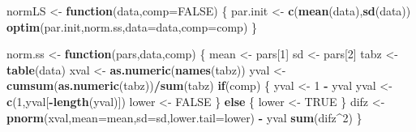 \documentclass[]{article}
\newenvironment{Shaded}{\begin{snugshade}}{\end{snugshade}}
\newcommand{\KeywordTok}[1]{\textcolor[rgb]{0.13,0.29,0.53}{\textbf{#1}}}
\newcommand{\DataTypeTok}[1]{\textcolor[rgb]{0.13,0.29,0.53}{#1}}
\newcommand{\DecValTok}[1]{\textcolor[rgb]{0.00,0.00,0.81}{#1}}
\newcommand{\StringTok}[1]{\textcolor[rgb]{0.31,0.60,0.02}{#1}}
\newcommand{\OtherTok}[1]{\textcolor[rgb]{0.56,0.35,0.01}{#1}}
\newcommand{\ControlFlowTok}[1]{\textcolor[rgb]{0.13,0.29,0.53}{\textbf{#1}}}
\newcommand{\OperatorTok}[1]{\textcolor[rgb]{0.81,0.36,0.00}{\textbf{#1}}}
\newcommand{\NormalTok}[1]{#1}
\begin{document}
\begin{Shaded}
\begin{Highlighting}[]
\NormalTok{normLS <-}\StringTok{ }\ControlFlowTok{function}\NormalTok{(data,}\DataTypeTok{comp=}\OtherTok{FALSE}\NormalTok{) \{}
\NormalTok{    par.init <-}\StringTok{ }\KeywordTok{c}\NormalTok{(}\KeywordTok{mean}\NormalTok{(data),}\KeywordTok{sd}\NormalTok{(data))}
    \KeywordTok{optim}\NormalTok{(par.init,norm.ss,}\DataTypeTok{data=}\NormalTok{data,}\DataTypeTok{comp=}\NormalTok{comp)}
\NormalTok{\}}

\NormalTok{norm.ss <-}\StringTok{ }\ControlFlowTok{function}\NormalTok{(pars,data,comp) \{}
\NormalTok{    mean <-}\StringTok{ }\NormalTok{pars[}\DecValTok{1}\NormalTok{]}
\NormalTok{    sd <-}\StringTok{ }\NormalTok{pars[}\DecValTok{2}\NormalTok{]}
\NormalTok{    tabz <-}\StringTok{ }\KeywordTok{table}\NormalTok{(data)}
\NormalTok{    xval <-}\StringTok{ }\KeywordTok{as.numeric}\NormalTok{(}\KeywordTok{names}\NormalTok{(tabz))}
\NormalTok{    yval <-}\StringTok{ }\KeywordTok{cumsum}\NormalTok{(}\KeywordTok{as.numeric}\NormalTok{(tabz))}\OperatorTok{/}\KeywordTok{sum}\NormalTok{(tabz)}
    \ControlFlowTok{if}\NormalTok{(comp) \{}
\NormalTok{        yval <-}\StringTok{ }\DecValTok{1} \OperatorTok{-}\StringTok{ }\NormalTok{yval}
\NormalTok{        yval <-}\StringTok{ }\KeywordTok{c}\NormalTok{(}\DecValTok{1}\NormalTok{,yval[}\OperatorTok{-}\KeywordTok{length}\NormalTok{(yval)])}
\NormalTok{        lower <-}\StringTok{ }\OtherTok{FALSE}
\NormalTok{    \} }\ControlFlowTok{else}\NormalTok{ \{}
\NormalTok{        lower <-}\StringTok{ }\OtherTok{TRUE}
\NormalTok{    \}}
\NormalTok{    difz <-}\StringTok{ }\KeywordTok{pnorm}\NormalTok{(xval,}\DataTypeTok{mean=}\NormalTok{mean,}\DataTypeTok{sd=}\NormalTok{sd,}\DataTypeTok{lower.tail=}\NormalTok{lower) }\OperatorTok{-}\StringTok{ }\NormalTok{yval}
    \KeywordTok{sum}\NormalTok{(difz}\OperatorTok{^}\DecValTok{2}\NormalTok{)}
\NormalTok{\}}
\end{Highlighting}
\end{Shaded}
\end{document}

